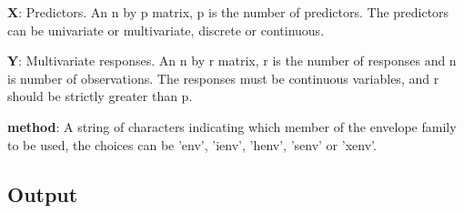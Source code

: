 \documentclass[a4paper,11pt,openany]{memoir}
\begin{document}
\begin{par}
\textbf{X}: Predictors. An n by p matrix, p is the number of predictors. The predictors can be univariate or multivariate, discrete or continuous.
\end{par} \vspace{1em}
\begin{par}
\textbf{Y}: Multivariate responses. An n by r matrix, r is the number of responses and n is number of observations. The responses must be continuous variables, and r should be strictly greater than p.
\end{par} \vspace{1em}
\begin{par}
\textbf{method}: A string of characters indicating which member of the envelope family to be used, the choices can be 'env', 'ienv', 'henv', 'senv' or 'xenv'.
\end{par} \vspace{1em}


\subsection*{Output}
\end{document}
